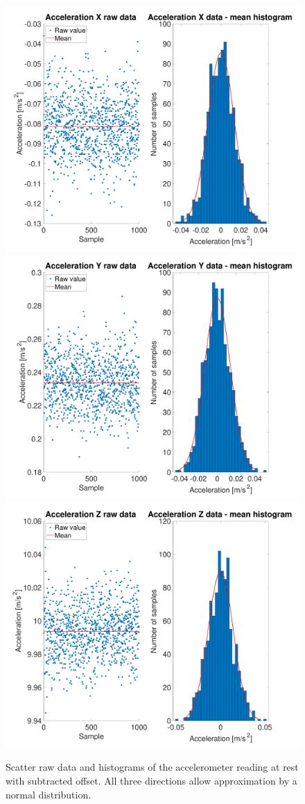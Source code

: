 \documentclass[DIV=14]{scrartcl}
\begin{document}
    \begin{figure}[h]

        \centering
        \includegraphics[width=.45\textwidth]{plots/plotAccelerationX}\hfill
        \includegraphics[width=.45\textwidth]{plots/plotAccelerationY}\vspace{1em}
        \includegraphics[width=.45\textwidth]{plots/plotAccelerationZ}\hfill
        \caption{Scatter raw data and histograms of the accelerometer reading at rest with subtracted offset. All three directions allow approximation by a normal distribution.}
        \label{fig:accelerationHist}
    \end{figure}
\end{document}
